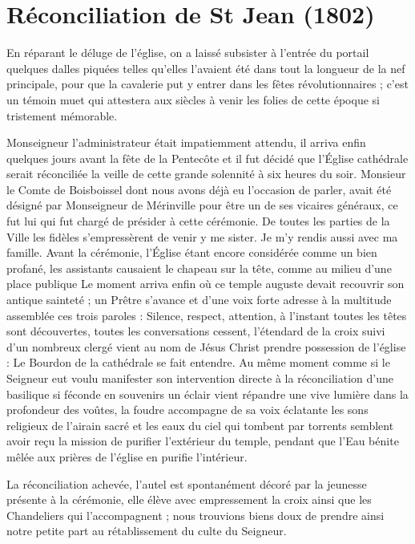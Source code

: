 \documentclass[11pt,a4paper]{report}
\begin{document}
\section*{Réconciliation de St Jean (1802)}

En réparant le déluge de l'église, on a laissé subsister à l'entrée du portail quelques dalles piquées telles qu'elles l'avaient été dans tout la longueur de la nef principale, pour que la cavalerie put y entrer dans les fêtes révolutionnaires ; c'est un témoin muet qui attestera aux siècles à venir les folies de cette époque si tristement mémorable.

Monseigneur l'administrateur était impatiemment attendu, il arriva enfin quelques jours avant la fête de la Pentecôte et il fut décidé que l'Église cathédrale serait réconciliée la veille de cette grande solennité à six heures du soir. Monsieur le Comte de Boisboissel dont nous avons déjà eu l'occasion de parler, avait été désigné par Monseigneur de Mérinville pour être un de ses vicaires généraux, ce fut lui qui fut chargé de présider à cette cérémonie. De toutes les parties de la Ville les fidèles s'empressèrent de venir y me sister. Je m'y rendis aussi avec ma famille. Avant la cérémonie, l'Église étant encore considérée comme un bien profané, les assistants causaient le chapeau sur la tête, comme au milieu d'une place publique Le moment arriva enfin où ce temple auguste devait recouvrir son antique sainteté ; un Prêtre s'avance et d'une voix forte adresse à la multitude assemblée ces trois paroles : Silence, respect, attention, à l'instant toutes les têtes sont découvertes, toutes les conversations cessent, l'étendard de la croix suivi d'un nombreux clergé vient au nom de Jésus Christ prendre possession de l'église : Le Bourdon de la cathédrale se fait entendre. Au même moment comme si le Seigneur eut voulu manifester son intervention directe à la réconciliation d'une basilique si féconde en souvenirs un éclair vient répandre une vive lumière dans la profondeur des voûtes, la foudre accompagne de sa voix éclatante les sons religieux de l'airain sacré et les eaux du ciel qui tombent par torrents semblent avoir reçu la mission de purifier l'extérieur du temple, pendant que l'Eau bénite mêlée aux prières de l'église en purifie l'intérieur.

La réconciliation achevée, l'autel est spontanément décoré par la jeunesse présente à la cérémonie, elle élève avec empressement la croix ainsi que les Chandeliers qui l'accompagnent ; nous trouvions biens doux de prendre ainsi notre petite part au rétablissement du culte du Seigneur.
\end{document}
